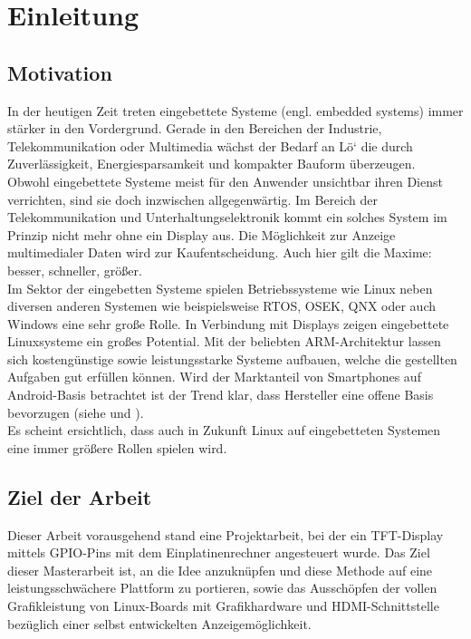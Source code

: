 
\chapter{Einleitung}
\label{cha:Einleitung}

\section{Motivation}
In der heutigen Zeit treten eingebettete Systeme (engl. embedded systems) immer stärker in den Vordergrund. Gerade in den Bereichen der Industrie, Telekommunikation oder Multimedia wächst der Bedarf an Lö` die durch Zuverlässigkeit, Energiesparsamkeit und kompakter Bauform überzeugen.\\
Obwohl eingebettete Systeme meist für den Anwender unsichtbar ihren Dienst verrichten, sind sie doch inzwischen allgegenwärtig. Im Bereich der Telekommunikation und Unterhaltungselektronik kommt ein solches System im Prinzip nicht mehr ohne ein Display aus. Die Möglichkeit zur Anzeige multimedialer Daten wird zur Kaufentscheidung. Auch hier gilt die Maxime: besser, schneller, größer.\\
Im Sektor der eingebetten Systeme spielen Betriebssysteme wie Linux neben diversen anderen Systemen wie beispielsweise RTOS, OSEK, QNX oder auch Windows eine sehr große Rolle. In Verbindung mit Displays zeigen eingebettete Linuxsysteme ein großes Potential. Mit der beliebten ARM-Architektur lassen sich kostengünstige sowie leistungsstarke Systeme aufbauen, welche die gestellten Aufgaben gut erfüllen können. Wird der Marktanteil von Smartphones auf Android-Basis betrachtet ist der Trend klar, dass Hersteller eine offene Basis bevorzugen (siehe \cite{android2014} und \cite{Brandt2013}).\\
Es scheint ersichtlich, dass auch in Zukunft Linux auf eingebetteten Systemen eine immer größere Rollen spielen wird. 

\section{Ziel der Arbeit}
Dieser Arbeit vorausgehend stand eine Projektarbeit, bei der ein TFT-Display mittels GPIO-Pins mit dem Einplatinenrechner  angesteuert wurde. Das Ziel dieser Masterarbeit ist, an die Idee anzuknüpfen und diese Methode auf eine leistungsschwächere Plattform zu portieren, sowie das Ausschöpfen der vollen Grafikleistung von Linux-Boards mit Grafikhardware und HDMI-Schnittstelle bezüglich einer selbst entwickelten Anzeigemöglichkeit.
